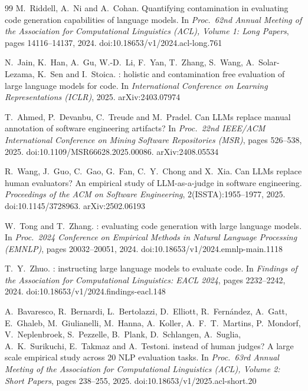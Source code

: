 \documentclass[11pt,a4paper]{article}
\begin{document}
\begin{thebibliography}{99}
M.~Riddell, A.~Ni and A.~Cohan.
\newblock Quantifying contamination in evaluating code generation
capabilities of language models.
\newblock In \emph{Proc.\ 62nd Annual Meeting of the Association for
Computational Linguistics (ACL), Volume 1: Long Papers}, pages
14116--14137, 2024.
\newblock doi:10.18653/v1/2024.acl-long.761

N.~Jain, K.~Han, A.~Gu, W.-D.~Li, F.~Yan, T.~Zhang, S.~Wang,
A.~Solar-Lezama, K.~Sen and I.~Stoica.
: holistic and contamination free evaluation of
large language models for code.
\newblock In \emph{International Conference on Learning Representations
(ICLR)}, 2025.
\newblock arXiv:2403.07974

T.~Ahmed, P.~Devanbu, C.~Treude and M.~Pradel.
\newblock Can {LLMs} replace manual annotation of software engineering
artifacts?
\newblock In \emph{Proc.\ 22nd IEEE/ACM International Conference on Mining
Software Repositories (MSR)}, pages 526--538, 2025.
\newblock doi:10.1109/MSR66628.2025.00086. arXiv:2408.05534

R.~Wang, J.~Guo, C.~Gao, G.~Fan, C.~Y.~Chong and X.~Xia.
\newblock Can {LLMs} replace human evaluators? {A}n empirical study of
{LLM}-as-a-judge in software engineering.
\newblock \emph{Proceedings of the ACM on Software Engineering},
2(ISSTA):1955--1977, 2025.
\newblock doi:10.1145/3728963. arXiv:2502.06193

W.~Tong and T.~Zhang.
: evaluating code generation with large language models.
\newblock In \emph{Proc.\ 2024 Conference on Empirical Methods in Natural
Language Processing (EMNLP)}, pages 20032--20051, 2024.
\newblock doi:10.18653/v1/2024.emnlp-main.1118

T.~Y.~Zhuo.
: instructing large language models to evaluate code.
\newblock In \emph{Findings of the Association for Computational Linguistics:
EACL 2024}, pages 2232--2242, 2024.
\newblock doi:10.18653/v1/2024.findings-eacl.148

A.~Bavaresco, R.~Bernardi, L.~Bertolazzi, D.~Elliott, R.~Fern\'andez,
A.~Gatt, E.~Ghaleb, M.~Giulianelli, M.~Hanna, A.~Koller, A.~F.~T.~Martins,
P.~Mondorf, V.~Neplenbroek, S.~Pezzelle, B.~Plank, D.~Schlangen, A.~Suglia,
A.~K.~Surikuchi, E.~Takmaz and A.~Testoni.
 instead of human judges? {A} large scale empirical study
across 20 {NLP} evaluation tasks.
\newblock In \emph{Proc.\ 63rd Annual Meeting of the Association for
Computational Linguistics (ACL), Volume 2: Short Papers}, pages 238--255,
2025.
\newblock doi:10.18653/v1/2025.acl-short.20


\end{thebibliography}
\end{document}
